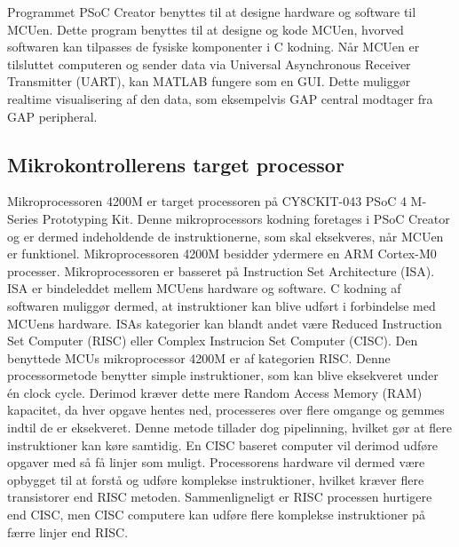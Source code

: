 Programmet PSoC Creator benyttes til at designe hardware og software til MCUen. Dette program benyttes til at designe og kode MCUen, hvorved softwaren kan tilpasses de fysiske komponenter i C kodning. \citep{Semiconductor2016} Når MCUen er tilsluttet computeren og sender data via Universal Asynchronous Receiver Transmitter (UART), kan MATLAB fungere som en GUI. Dette muliggør realtime visualisering af den data, som eksempelvis GAP central modtager fra GAP peripheral. \citep{Semiconductor2016,Sparkfun2016}

\subsection{Mikrokontrollerens target processor}
Mikroprocessoren 4200M er target processoren på CY8CKIT-043 PSoC 4 M-Series Prototyping Kit. Denne mikroprocessors kodning foretages i PSoC Creator og er dermed indeholdende de instruktionerne, som skal eksekveres, når MCUen er funktionel. Mikroprocessoren 4200M besidder ydermere en ARM Cortex-M0 processer. \newline
Mikroprocessoren er basseret på Instruction Set Architecture (ISA). ISA er bindeleddet mellem MCUens hardware og software. C kodning af softwaren muliggør dermed, at instruktioner kan blive udført i forbindelse med MCUens hardware. ISAs kategorier kan blandt andet være Reduced Instruction Set Computer (RISC) eller Complex Instrucion Set Computer (CISC). \citep{CYPRESS2016Cortexm0,Semiconductor20164200M,Yadav2016} \newline
Den benyttede MCUs mikroprocessor 4200M er af kategorien RISC. Denne processormetode benytter simple instruktioner, som kan blive eksekveret under én clock cycle. Derimod kræver dette mere Random Access Memory (RAM) kapacitet, da hver opgave hentes ned, processeres over flere omgange og gemmes indtil de er eksekveret. Denne metode tillader dog pipelinning, hvilket gør at flere instruktioner kan køre samtidig. En CISC baseret computer vil derimod udføre opgaver med så få linjer som muligt. Processorens hardware vil dermed være opbygget til at forstå og udføre komplekse instruktioner, hvilket kræver flere transistorer end RISC metoden. Sammenligneligt er RISC processen hurtigere end CISC, men CISC computere kan udføre flere komplekse instruktioner på færre linjer end RISC. \citep{CYPRESS2016Cortexm0,Semiconductor20164200M,Yadav2016}\\
